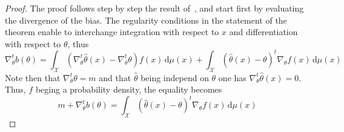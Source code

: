 \documentclass[english,sort&compress]{elsarticle}
\theoremstyle{definition}
\theoremstyle{plain}
\theoremstyle{plain}
\def\dmu{\mathrm{d}\mu}
\def\X{\mathcal{X}}
\begin{document}
\begin{proof}
  The  proof follows  step by  step the  result of~\cite{Ber12:06_2},  and start
  first by evaluating the divergence  of the bias.  The regularity conditions in
  the statement of the theorem enable to interchange integration with respect to
  $x$ and differentiation with respect to $\theta$, thus
  \[
  \nabla_\theta^t b(\theta) = \int_\X \left( \nabla_\theta^t \widehat{\theta}(x)
    -  \nabla_\theta^t   \theta  \right)  f(x)  \,  \dmu(x)   +  \int_\X  \left(
    \widehat{\theta}(x) - \theta \right)^t \nabla_\theta f(x) \, \dmu(x)
  \]
  Note then that $\nabla_\theta^t \theta  = m$ and that $\widehat{\theta}$ being
  independ on $\theta$ one  has $\nabla_\theta^t \widehat{\theta}(x) = 0$. Thus,
  $f$ beging a probability density, the equality becomes
  \[
  m +  \nabla_\theta^t b(\theta) =  \int_\X \left( \widehat{\theta}(x)  - \theta
  \right)^t \nabla_\theta f(x) \, \dmu(x)
  \]
%
\end{proof}
\end{document}

